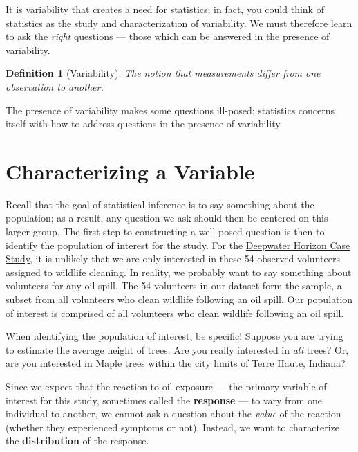 \documentclass[
]{book}
\theoremstyle{plain}
\theoremstyle{mydefn}
\newtheorem{definition}{Definition}[chapter]
\theoremstyle{myexmpl}
\theoremstyle{remark}
\begin{document}
It is variability that creates a need for statistics; in fact, you could think of statistics as the study and characterization of variability. We must therefore learn to ask the \emph{right} questions --- those which can be answered in the presence of variability.

\begin{definition}[Variability]
\protect\hypertarget{def:defn-variability}{}{\label{def:defn-variability} {} }The notion that measurements differ from one observation to another.
\end{definition}

\begin{rmdkeyidea}
The presence of variability makes some questions ill-posed; statistics concerns itself with how to address questions in the presence of variability.
\end{rmdkeyidea}

\hypertarget{characterizing-a-variable}{%
\section{Characterizing a Variable}\label{characterizing-a-variable}}

Recall that the goal of statistical inference is to say something about the population; as a result, any question we ask should then be centered on this larger group. The first step to constructing a well-posed question is then to identify the population of interest for the study. For the \protect\hyperlink{CaseDeepwater}{Deepwater Horizon Case Study}, it is unlikely that we are only interested in these 54 observed volunteers assigned to wildlife cleaning. In reality, we probably want to say something about volunteers for any oil spill. The 54 volunteers in our dataset form the sample, a subset from all volunteers who clean wildlife following an oil spill. Our population of interest is comprised of all volunteers who clean wildlife following an oil spill.

\begin{rmdtip}
When identifying the population of interest, be specific! Suppose you are trying to estimate the average height of trees. Are you really interested in \emph{all} trees? Or, are you interested in Maple trees within the city limits of Terre Haute, Indiana?
\end{rmdtip}

Since we expect that the reaction to oil exposure --- the primary variable of interest for this study, sometimes called the \textbf{response} --- to vary from one individual to another, we cannot ask a question about the \emph{value} of the reaction (whether they experienced symptoms or not). Instead, we want to characterize the \textbf{distribution} of the response.
\end{document}
